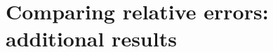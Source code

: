 \documentclass[11pt]{article}
\begin{document}
%	
%
%	
%
%
%
%
%


\newpage

 



\newpage
\appendix
\section{Comparing relative errors: additional results}\label{Appendix:Comparing relative errors: additional results}
\end{document}
